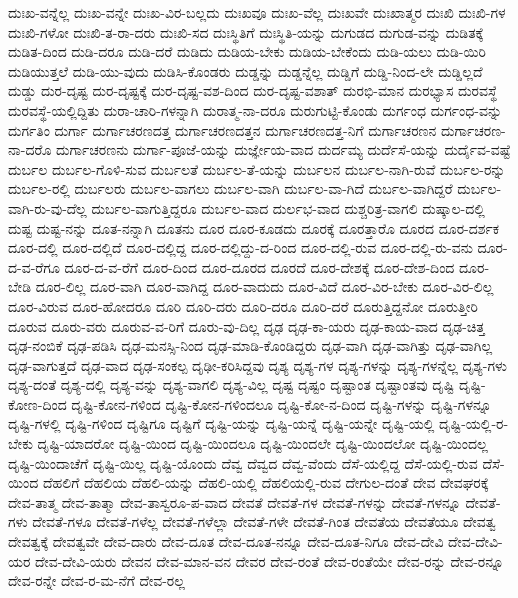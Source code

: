 {ದುಃಖ-ವನ್ನೆಲ್ಲ
ದುಃಖ-ವನ್ನೇ
ದುಃಖ-ವಿರ-ಬಲ್ಲದು
ದುಃಖವೂ
ದುಃಖ-ವೆಲ್ಲ
ದುಃಖವೇ
ದುಃಖಾತ್ಮರ
ದುಃಖಿ
ದುಃಖಿ-ಗಳ
ದುಃಖಿ-ಗಳೋ
ದುಃಖಿ-ತ-ರಾ-ದರು
ದುಃಖಿ-ಸದ
ದುಃಸ್ಥಿತಿಗೆ
ದುಃಸ್ಥಿತಿ-ಯನ್ನು
ದುಗುಡದ
ದುಗುಡ-ವನ್ನು
ದುಡಿತಕ್ಕೆ
ದುಡಿತ-ದಿಂದ
ದುಡಿ-ದರೂ
ದುಡಿ-ದರೆ
ದುಡಿದು
ದುಡಿಯ-ಬೇಕು
ದುಡಿಯ-ಬೇಕೆಂದು
ದುಡಿ-ಯಲು
ದುಡಿ-ಯಿರಿ
ದುಡಿಯುತ್ತಲೆ
ದುಡಿ-ಯು-ವುದು
ದುಡಿಸಿ-ಕೊಂಡರು
ದುಡ್ಡನ್ನು
ದುಡ್ಡನ್ನೆಲ್ಲ
ದುಡ್ಡಿಗೆ
ದುಡ್ಡಿ-ನಿಂದ-ಲೇ
ದುಡ್ಡಿಲ್ಲದೆ
ದುಡ್ಡು
ದುರ-ದೃಷ್ಟ
ದುರ-ದೃಷ್ಟಕ್ಕೆ
ದುರ-ದೃಷ್ಟ-ವಶ-ದಿಂದ
ದುರ-ದೃಷ್ಟ-ವಶಾತ್
ದುರಭಿ-ಮಾನ
ದುರಭ್ಯಾಸ
ದುರವಸ್ಥೆ
ದುರವಸ್ಥೆ-ಯಲ್ಲಿದ್ದಿತು
ದುರಾ-ಚಾರಿ-ಗಳನ್ನಾಗಿ
ದುರಾತ್ಮ-ನಾ-ದರೂ
ದುರುಗುಟ್ಟಿ-ಕೊಂಡು
ದುರ್ಗಂಧ
ದುರ್ಗಂಧ-ವನ್ನು
ದುರ್ಗತಿಂ
ದುರ್ಗಾ
ದುರ್ಗಾಚರಣದತ್ತ
ದುರ್ಗಾಚರಣದತ್ತನ
ದುರ್ಗಾಚರಣದತ್ತ-ನಿಗೆ
ದುರ್ಗಾಚರಣನ
ದುರ್ಗಾಚರಣ-ನಾ-ದರೊ
ದುರ್ಗಾಚರಣನು
ದುರ್ಗಾ-ಪೂಜೆ-ಯನ್ನು
ದುರ್ಜ್ಞೇಯ-ವಾದ
ದುರ್ದಮ್ಯ
ದುರ್ದೆಸೆ-ಯನ್ನು
ದುರ್ದೈವ-ವಷ್ಟೆ
ದುರ್ಬಲ
ದುರ್ಬಲ-ಗೊಳಿ-ಸುವ
ದುರ್ಬಲತೆ
ದುರ್ಬಲ-ತೆ-ಯನ್ನು
ದುರ್ಬಲನ
ದುರ್ಬಲ-ನಾಗಿ-ರುವೆ
ದುರ್ಬಲ-ರನ್ನು
ದುರ್ಬಲ-ರಲ್ಲಿ
ದುರ್ಬಲರು
ದುರ್ಬಲ-ವಾಗಲು
ದುರ್ಬಲ-ವಾಗಿ
ದುರ್ಬಲ-ವಾ-ಗಿದೆ
ದುರ್ಬಲ-ವಾಗಿದ್ದರೆ
ದುರ್ಬಲ-ವಾಗಿ-ರು-ವು-ದೆಲ್ಲ
ದುರ್ಬಲ-ವಾಗುತ್ತಿದ್ದರೂ
ದುರ್ಬಲ-ವಾದ
ದುರ್ಲಭ-ವಾದ
ದುಶ್ಚರಿತ್ರ-ವಾಗಲಿ
ದುಷ್ಕಾಲ-ದಲ್ಲಿ
ದುಷ್ಟ
ದುಷ್ಟ-ನನ್ನು
ದೂತ-ನನ್ನಾಗಿ
ದೂತನು
ದೂರ
ದೂರ-ಕೂಡದು
ದೂರಕ್ಕೆ
ದೂರತ್ತಾರೊ
ದೂರದ
ದೂರ-ದರ್ಶಕ
ದೂರ-ದಲ್ಲಿ
ದೂರ-ದಲ್ಲಿದೆ
ದೂರ-ದಲ್ಲಿದ್ದ
ದೂರ-ದಲ್ಲಿದ್ದು-ದ-ರಿಂದ
ದೂರ-ದಲ್ಲಿ-ರುವ
ದೂರ-ದಲ್ಲಿ-ರು-ವನು
ದೂರ-ದ-ವ-ರೆಗೂ
ದೂರ-ದ-ವ-ರೆಗೆ
ದೂರ-ದಿಂದ
ದೂರ-ದೂರದ
ದೂರದೆ
ದೂರ-ದೇಶಕ್ಕೆ
ದೂರ-ದೇಶ-ದಿಂದ
ದೂರ-ಬೇಡಿ
ದೂರ-ಲಿಲ್ಲ
ದೂರ-ವಾಗಿ
ದೂರ-ವಾಗಿದ್ದ
ದೂರ-ವಾದುದು
ದೂರ-ವಿದೆ
ದೂರ-ವಿರ-ಬೇಕು
ದೂರ-ವಿರ-ಲಿಲ್ಲ
ದೂರ-ವಿರುವ
ದೂರ-ಹೋದರೂ
ದೂರಿ
ದೂರಿ-ದರು
ದೂರಿ-ದರೂ
ದೂರಿ-ದರೆ
ದೂರುತ್ತಿದ್ದನೋ
ದೂರುತ್ತೀರಿ
ದೂರುವ
ದೂರು-ವರು
ದೂರುವ-ವ-ರಿಗೆ
ದೂರು-ವು-ದಿಲ್ಲ
ದೃಢ
ದೃಢ-ಕಾ-ಯರು
ದೃಢ-ಕಾಯ-ವಾದ
ದೃಢ-ಚಿತ್ತ
ದೃಢ-ನಂಬಿಕೆ
ದೃಢ-ಪಡಿಸಿ
ದೃಢ-ಮನಸ್ಸಿ-ನಿಂದ
ದೃಢ-ಮಾಡಿ-ಕೊಂಡಿದ್ದರು
ದೃಢ-ವಾಗಿ
ದೃಢ-ವಾಗಿತ್ತು
ದೃಢ-ವಾಗಿಲ್ಲ
ದೃಢ-ವಾಗುತ್ತದೆ
ದೃಢ-ವಾದ
ದೃಢ-ಸಂಕಲ್ಪ
ದೃಢೀ-ಕರಿಸಿದ್ದವು
ದೃಶ್ಯ
ದೃಶ್ಯ-ಗಳ
ದೃಶ್ಯ-ಗಳನ್ನು
ದೃಶ್ಯ-ಗಳನ್ನೆಲ್ಲ
ದೃಶ್ಯ-ಗಳು
ದೃಶ್ಯ-ದಂತೆ
ದೃಶ್ಯ-ದಲ್ಲಿ
ದೃಶ್ಯ-ವನ್ನು
ದೃಶ್ಯ-ವಾಗಲಿ
ದೃಶ್ಯ-ವಿಲ್ಲ
ದೃಷ್ಟ
ದೃಷ್ಟಂ
ದೃಷ್ಟಾಂತ
ದೃಷ್ಟಾಂತವು
ದೃಷ್ಟಿ
ದೃಷ್ಟಿ-ಕೋಣ-ದಿಂದ
ದೃಷ್ಟಿ-ಕೋನ-ಗಳಿಂದ
ದೃಷ್ಟಿ-ಕೋನ-ಗಳಿಂದಲೂ
ದೃಷ್ಟಿ-ಕೋ-ನ-ದಿಂದ
ದೃಷ್ಟಿ-ಗಳನ್ನು
ದೃಷ್ಟಿ-ಗಳನ್ನೂ
ದೃಷ್ಟಿ-ಗಳಲ್ಲಿ
ದೃಷ್ಟಿ-ಗಳಿಂದ
ದೃಷ್ಟಿಗೂ
ದೃಷ್ಟಿಗೆ
ದೃಷ್ಟಿ-ಯನ್ನು
ದೃಷ್ಟಿ-ಯನ್ನೆ
ದೃಷ್ಟಿ-ಯನ್ನೇ
ದೃಷ್ಟಿ-ಯಲ್ಲಿ
ದೃಷ್ಟಿ-ಯಲ್ಲಿ-ರ-ಬೇಕು
ದೃಷ್ಟಿ-ಯಾದರೋ
ದೃಷ್ಟಿ-ಯಿಂದ
ದೃಷ್ಟಿ-ಯಿಂದಲೂ
ದೃಷ್ಟಿ-ಯಿಂದಲೇ
ದೃಷ್ಟಿ-ಯಿಂದಲೋ
ದೃಷ್ಟಿ-ಯಿಂದಲ್ಲ
ದೃಷ್ಟಿ-ಯಿಂದಾಚೆಗೆ
ದೃಷ್ಟಿ-ಯಿಲ್ಲ
ದೃಷ್ಟಿ-ಯೊಂದು
ದೆವ್ವ
ದೆವ್ವದ
ದೆವ್ವ-ವೆಂದು
ದೆಸೆ-ಯಲ್ಲಿದ್ದ
ದೆಸೆ-ಯಲ್ಲಿ-ರುವ
ದೆಸೆ-ಯಿಂದ
ದೆಹಲಿಗೆ
ದೆಹಲಿಯ
ದೆಹಲಿ-ಯನ್ನು
ದೆಹಲಿ-ಯಲ್ಲಿ
ದೆಹಲಿಯಲ್ಲಿ-ರುವ
ದೇಗುಲ-ದಂತೆ
ದೇವ
ದೇವಘರಕ್ಕೆ
ದೇವ-ತಾತ್ಮ
ದೇವ-ತಾತ್ಮಾ
ದೇವ-ತಾಸ್ವರೂ-ಪ-ವಾದ
ದೇವತೆ
ದೇವತೆ-ಗಳ
ದೇವತೆ-ಗಳನ್ನು
ದೇವತೆ-ಗಳನ್ನೂ
ದೇವತೆ-ಗಳು
ದೇವತೆ-ಗಳೂ
ದೇವತೆ-ಗಳೆಲ್ಲ
ದೇವತೆ-ಗಳೆಲ್ಲಾ
ದೇವತೆ-ಗಳೇ
ದೇವತೆ-ಗಿಂತ
ದೇವತೆಯ
ದೇವತೆಯೂ
ದೇವತ್ವ
ದೇವತ್ವಕ್ಕೆ
ದೇವತ್ವವೇ
ದೇವ-ದಾರು
ದೇವ-ದೂತ
ದೇವ-ದೂತ-ನನ್ನೂ
ದೇವ-ದೂತ-ನಿಗೂ
ದೇವ-ದೇವಿ
ದೇವ-ದೇವಿ-ಯರ
ದೇವ-ದೇವಿ-ಯರು
ದೇವನ
ದೇವ-ಮಾನ-ವನ
ದೇವರ
ದೇವ-ರಂತೆ
ದೇವ-ರಂತೆಯೇ
ದೇವ-ರನ್ನು
ದೇವ-ರನ್ನೂ
ದೇವ-ರನ್ನೇ
ದೇವ-ರ-ಮ-ನೆಗೆ
ದೇವ-ರಲ್ಲ
}
